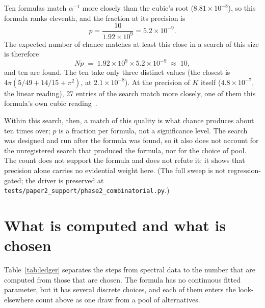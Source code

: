 \documentclass[aps,prl,twocolumn,superscriptaddress]{revtex4-2}
\begin{document}
Ten formulas match $\alpha^{-1}$ more closely than the cubic's root
($8.81\times10^{-8}$), so this formula ranks eleventh, and the fraction
at its precision is
\begin{equation}
  p = \frac{10}{1.92\times10^{9}} = 5.2\times10^{-9}.
\end{equation}
The expected number of chance matches at least this close in a search
of this size is therefore
\begin{equation}\label{eq:chance_count}
  N p \;=\; 1.92\times10^{9} \times 5.2\times10^{-9} \;\approx\; 10 ,
\end{equation}
and ten are found. The ten take only three distinct values (the
closest is $4\pi(5/49 + 14/15 + \pi^2)$, at $2.1\times10^{-8}$). At the
precision of $K$ itself ($4.8\times10^{-7}$, the linear reading), 27
entries of the search match more closely, one of them this formula's
own cubic reading~\cite{phase2_audit}.

Within this search, then, a match of this quality is what chance
produces about ten times over; $p$ is a fraction per formula, not a
significance level. The search was designed and run after the formula
was found, so it also does not account for the unregistered search
that produced the formula, nor for the choice of pool. The count does
not support the formula and does not refute it; it shows that precision
alone carries no evidential weight here. (The full sweep is not
regression-gated; the driver is preserved at
\texttt{tests/paper2\_support/phase2\_combinatorial.py}.)


\section{What is computed and what is chosen}\label{sec:ledger}

Table~\ref{tab:ledger} separates the steps from spectral data to the
number that are computed from those that are chosen. The formula has no
continuous fitted parameter, but it has several discrete choices, and
each of them enters the look-elsewhere count above as one draw from a
pool of alternatives.
\end{document}
